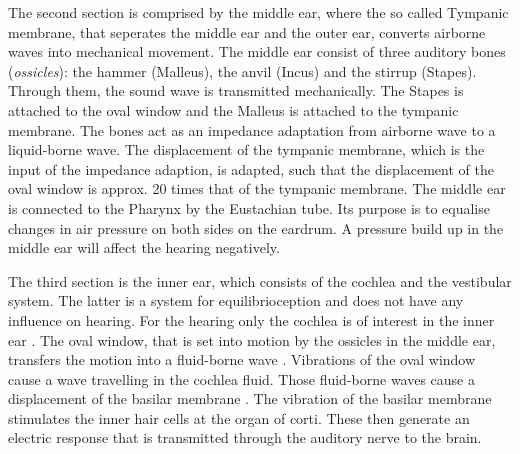 The second section is comprised by the middle ear, where the so called Tympanic membrane, that seperates the middle ear and the outer ear, converts airborne waves into mechanical movement. The middle ear consist of three auditory bones (\textit{ossicles}): the hammer (Malleus), the anvil (Incus) and the stirrup (Stapes). Through them, the sound wave is transmitted mechanically. The Stapes is attached to the oval window and the Malleus is attached to the tympanic membrane. The bones act as an impedance adaptation from airborne wave to a liquid-borne wave. The displacement of the tympanic membrane, which is the input of the impedance adaption, is adapted, such that the displacement of the oval window is approx. 20 times that of the tympanic membrane. The middle ear is connected to the Pharynx by the Eustachian tube. Its purpose is to equalise changes in air pressure on both sides on the eardrum. A pressure build up in the middle ear will affect the hearing negatively. %

The third section is the inner ear, which consists of the cochlea and the vestibular system. The latter is a system for equilibrioception and does not have any influence on hearing. For the hearing only the cochlea is of interest in the inner ear . The oval window, that is set into motion by the ossicles in the middle ear, transfers the motion into a fluid-borne wave \citep{ho_2017}.
Vibrations of the oval window cause a wave travelling in the cochlea fluid. Those fluid-borne waves cause a displacement of the basilar membrane \citep{ho_2017}. The vibration of the basilar membrane stimulates the inner hair cells at the organ of corti. These then generate an electric response that is transmitted through the auditory nerve to the brain.



